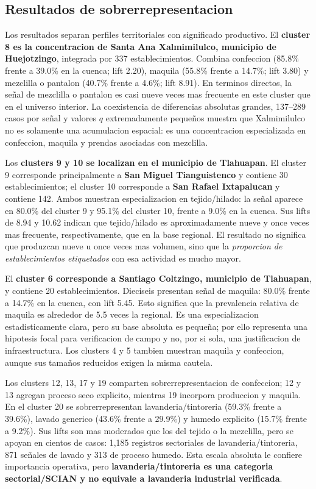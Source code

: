 \documentclass[11pt,letterpaper]{article}
\begin{document}
\subsection{Resultados de sobrerrepresentacion}

Los resultados separan perfiles territoriales con significado productivo. El \textbf{cluster 8 es la concentracion de Santa Ana Xalmimilulco, municipio de Huejotzingo}, integrada por 337 establecimientos. Combina confeccion (85.8\% frente a 39.0\% en la cuenca; lift 2.20), maquila (55.8\% frente a 14.7\%; lift 3.80) y mezclilla o pantalon (40.7\% frente a 4.6\%; lift 8.91). En terminos directos, la señal de mezclilla o pantalon es casi nueve veces mas frecuente en este cluster que en el universo interior. La coexistencia de diferencias absolutas grandes, 137--289 casos por señal y valores $q$ extremadamente pequeños muestra que Xalmimilulco no es solamente una acumulacion espacial: es una concentracion especializada en confeccion, maquila y prendas asociadas con mezclilla.

Los \textbf{clusters 9 y 10 se localizan en el municipio de Tlahuapan}. El cluster 9 corresponde principalmente a \textbf{San Miguel Tianguistenco} y contiene 30 establecimientos; el cluster 10 corresponde a \textbf{San Rafael Ixtapalucan} y contiene 142. Ambos muestran especializacion en tejido/hilado: la señal aparece en 80.0\% del cluster 9 y 95.1\% del cluster 10, frente a 9.0\% en la cuenca. Sus lifts de 8.94 y 10.62 indican que tejido/hilado es aproximadamente nueve y once veces mas frecuente, respectivamente, que en la base regional. El resultado no significa que produzcan nueve u once veces mas volumen, sino que la \emph{proporcion de establecimientos etiquetados} con esa actividad es mucho mayor.

El \textbf{cluster 6 corresponde a Santiago Coltzingo, municipio de Tlahuapan}, y contiene 20 establecimientos. Dieciseis presentan señal de maquila: 80.0\% frente a 14.7\% en la cuenca, con lift 5.45. Esto significa que la prevalencia relativa de maquila es alrededor de 5.5 veces la regional. Es una especializacion estadisticamente clara, pero su base absoluta es pequeña; por ello representa una hipotesis focal para verificacion de campo y no, por si sola, una justificacion de infraestructura. Los clusters 4 y 5 tambien muestran maquila y confeccion, aunque sus tamaños reducidos exigen la misma cautela.

Los clusters 12, 13, 17 y 19 comparten sobrerrepresentacion de confeccion; 12 y 13 agregan proceso seco explicito, mientras 19 incorpora produccion y maquila. En el cluster 20 se sobrerrepresentan lavanderia/tintoreria (59.3\% frente a 39.6\%), lavado generico (43.6\% frente a 29.9\%) y humedo explicito (15.7\% frente a 9.2\%). Sus lifts son mas moderados que los del tejido o la mezclilla, pero se apoyan en cientos de casos: 1,185 registros sectoriales de lavanderia/tintoreria, 871 señales de lavado y 313 de proceso humedo. Esta escala absoluta le confiere importancia operativa, pero \textbf{lavanderia/tintoreria es una categoria sectorial/SCIAN y no equivale a lavanderia industrial verificada}.
\end{document}
